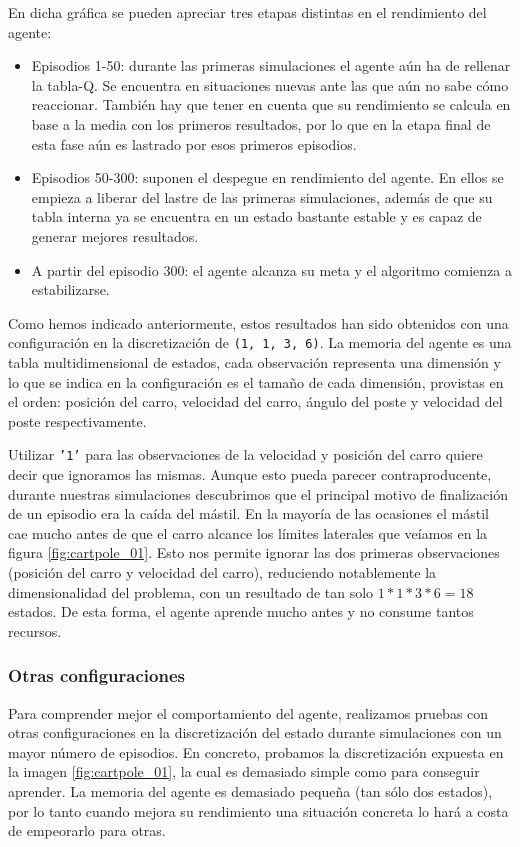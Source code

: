 En dicha gráfica se pueden apreciar tres etapas distintas en el rendimiento del agente:
\begin{itemize}
    \item Episodios 1-50: durante las primeras simulaciones el agente aún ha de rellenar la tabla-Q. Se encuentra en situaciones nuevas ante las que aún no sabe cómo reaccionar. También hay que tener en cuenta que su rendimiento se calcula en base a la media con los primeros resultados, por lo que en la etapa final de esta fase aún es lastrado por esos primeros episodios.
    \item Episodios 50-300: suponen el despegue en rendimiento del agente. En ellos se empieza a liberar del lastre de las primeras simulaciones, además de que su tabla interna ya se encuentra en un estado bastante estable y es capaz de generar mejores resultados.
    \item A partir del episodio 300: el agente alcanza su meta y el algoritmo comienza a estabilizarse.
\end{itemize}

Como hemos indicado anteriormente, estos resultados han sido obtenidos con una configuración en la discretización de \texttt{(1, 1, 3, 6)}. La memoria del agente es una tabla multidimensional de estados, cada observación representa una dimensión y lo que se indica en la configuración es el tamaño de cada dimensión, provistas en el orden: posición del carro, velocidad del carro, ángulo del poste y velocidad del poste respectivamente.

Utilizar \texttt{'1'} para las observaciones de la velocidad y posición del carro quiere decir que ignoramos las mismas. Aunque esto pueda parecer contraproducente, durante nuestras simulaciones descubrimos que el principal motivo de finalización de un episodio era la caída del mástil. En la mayoría de las ocasiones el mástil cae mucho antes de que el carro alcance los límites laterales que veíamos en la figura \ref{fig:cartpole_01}. Esto nos permite ignorar las dos primeras observaciones (posición del carro y velocidad del carro), reduciendo notablemente la dimensionalidad del problema, con un resultado de tan solo $1*1*3*6=18$ estados. De esta forma, el agente aprende mucho antes y no consume tantos recursos.


\subsubsection{Otras configuraciones}

Para comprender mejor el comportamiento del agente, realizamos pruebas con otras configuraciones en la discretización del estado durante simulaciones con un mayor número de episodios. En concreto, probamos la discretización expuesta en la imagen \ref{fig:cartpole_01}, la cual es demasiado simple como para conseguir aprender. La memoria del agente es demasiado pequeña (tan sólo dos estados), por lo tanto cuando mejora su rendimiento una situación concreta lo hará a costa de empeorarlo para otras.

